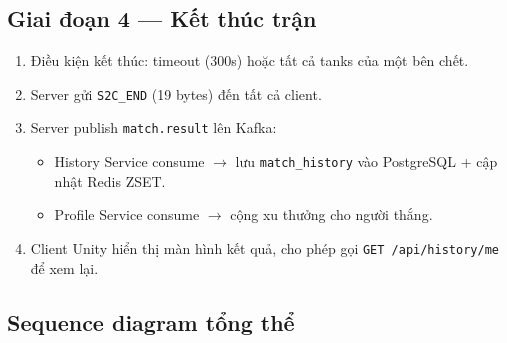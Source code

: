 \documentclass[12pt,a4paper]{report}
\newcommand{\topic}[1]{\texttt{\textcolor{micropurple}{#1}}}
\begin{document}
\subsection{Giai đoạn 4 --- Kết thúc trận}

\begin{enumerate}
  \item Điều kiện kết thúc: timeout (300s) hoặc tất cả tanks của một bên chết.
  \item Server gửi \texttt{S2C\_END} (19 bytes) đến tất cả client.
  \item Server publish \topic{match.result} lên Kafka:
    \begin{itemize}
      \item History Service consume $\rightarrow$ lưu \texttt{match\_history} vào PostgreSQL + cập nhật Redis ZSET.
      \item Profile Service consume $\rightarrow$ cộng xu thưởng cho người thắng.
    \end{itemize}
  \item Client Unity hiển thị màn hình kết quả, cho phép gọi \texttt{GET /api/history/me} để xem lại.
\end{enumerate}

\subsection{Sequence diagram tổng thể}
\end{document}
